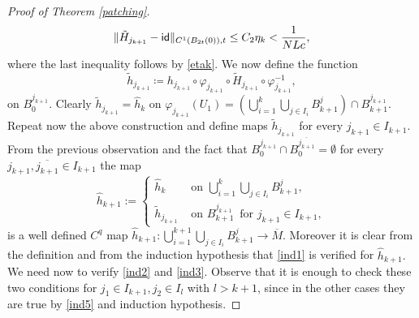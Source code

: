 \documentclass[11pt]{article}
\renewcommand{\phi}{\varphi}
\theoremstyle{plain}
\theoremstyle{definition}
\numberwithin{equation}{section}
\begin{document}
\begin{proof}[Proof of Theorem \ref{patching}]
	\begin{equation}\label{ind4}
		\|\tilde H_{j_{k+1}}-{\sf{id}} \|_{C^1(B_{2t}(0)),t}\le C_2\eta_{k}<\frac{1}{NLc},
	\end{equation}
	where the last inequality follows by \eqref{etak}.
	We now define the function
	\begin{equation}\label{modification}
		\tilde h_{j_{k+1}}\coloneqq h_{j_{k+1}} \circ \phi_{j_{k+1}}\circ \tilde H_{j_{k+1}} \circ \phi_{j_{k+1}}^{-1},
	\end{equation}
	on $B_0^{j_{k+1}}$.
	Clearly  $\tilde h_{j_{k+1}}=\hat h_k$ on $\phi_{j_{k+1}}(U_1)=(\bigcup_{i=1}^k \bigcup_{j\in I_i} B^j_{k+1})\cap B_{k+1}^{j_{k+1}}.$ Repeat now the above construction and define maps $\tilde h_{j_{k+1}}$ for every $j_{k+1}\in I_{k+1}$. From the previous observation and the fact that $B_0^{j_{k+1}}\cap B_0^{\overline{j_{k+1}}} =\emptyset $ for every $j_{k+1},\overline{j_{k+1}} \in I_{k+1}$ the map
	\begin{equation}\label{ind5}
		\hat h_{k+1}:=
		\begin{cases}
			\hat h_k  &  \text{ on } \bigcup_{i=1}^k \bigcup_{j\in I_i} B^j_{k+1},\\
			\tilde h_{j_{k+1}}  &  \text{ on } B_{k+1}^{j_{k+1}} \, \text{ for } j_{k+1} \in I_{k+1},
		\end{cases}
	\end{equation}
	is a well defined $C^q$ map $\hat h_{k+1}: \bigcup_{i=1}^{k+1} \bigcup_{j\in I_i} B^j_{k+1} \to \overline{M} $. Moreover it is clear from the definition and from the induction hypothesis that \eqref{ind1} is verified for $\hat h_{k+1}.$ We need now to verify \eqref{ind2} and \eqref{ind3}. Observe that it is enough to check these two conditions for $j_1 \in I_{k+1}, j_2 \in I_{l}$ with $l>k+1$, since in the other cases they are true by \eqref{ind5} and induction hypothesis.
	


\end{proof}
\end{document}
